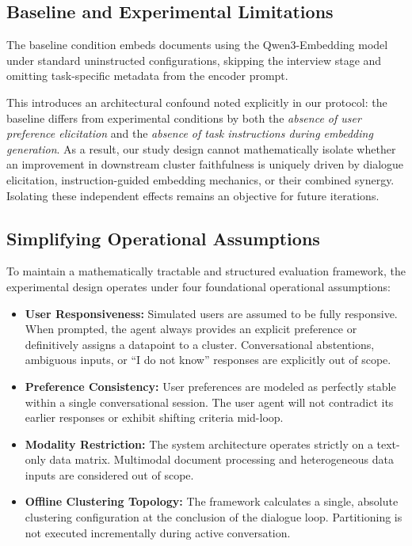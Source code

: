 \subsection{Baseline and Experimental Limitations}
The baseline condition embeds documents using the Qwen3-Embedding model under standard uninstructed configurations, skipping the interview stage and omitting task-specific metadata from the encoder prompt. 

This introduces an architectural confound noted explicitly in our protocol: 
the baseline differs from experimental conditions by both the \textit{absence of user preference elicitation} and the \textit{absence of task instructions during embedding generation}. 
As a result, our study design cannot mathematically isolate whether an improvement in downstream cluster faithfulness is uniquely driven by dialogue elicitation, instruction-guided embedding mechanics, or their combined synergy. 
Isolating these independent effects remains an objective for future iterations.

\subsection{Simplifying Operational Assumptions}
\label{subsec:assumptions}
To maintain a mathematically tractable and structured evaluation framework, the experimental design operates under four foundational operational assumptions:
\begin{itemize}
    \item \textbf{User Responsiveness:} 
    Simulated users are assumed to be fully responsive. When prompted, the agent always provides an explicit preference or definitively assigns a datapoint to a cluster. 
    Conversational abstentions, ambiguous inputs, or ``I do not know'' responses are explicitly out of scope.
    \item \textbf{Preference Consistency:} 
    User preferences are modeled as perfectly stable within a single conversational session. 
    The user agent will not contradict its earlier responses or exhibit shifting criteria mid-loop.
    \item \textbf{Modality Restriction:} 
    The system architecture operates strictly on a text-only data matrix. 
    Multimodal document processing and heterogeneous data inputs are considered out of scope.
    \item \textbf{Offline Clustering Topology:} 
    The framework calculates a single, absolute clustering configuration at the conclusion of the dialogue loop. 
    Partitioning is not executed incrementally during active conversation.
\end{itemize}